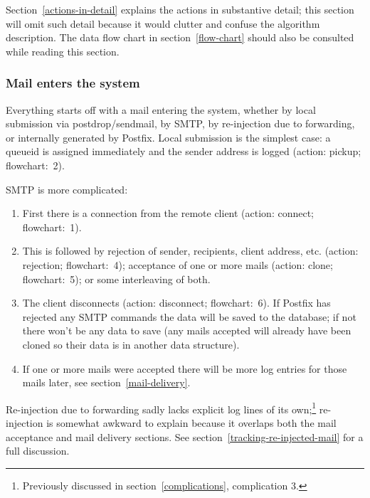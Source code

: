 \documentclass[a4paper,12pt,draft]{article}
\begin{document}
Section~\ref{actions-in-detail} explains the actions in substantive detail;
this section will omit such detail because it would clutter and confuse the
algorithm description.  The data flow chart in section~\ref{flow-chart}
should also be consulted while reading this section.

\subsubsection{Mail enters the system}

\label{mail-enters-the-system}

Everything starts off with a mail entering the system, whether by local
submission via postdrop/sendmail, by SMTP, by re-injection due to
forwarding, or internally generated by Postfix.  Local submission is the
simplest case: a queueid is assigned immediately and the sender address is
logged (action: pickup; flowchart:~2).

SMTP is more complicated: 

\begin{enumerate}
        
    \item First there is a connection from the remote client
        (action: connect; flowchart:~1).

    \item This is followed by rejection of sender, recipients, client
        address, etc. (action: rejection; flowchart:~4); acceptance of one
        or more mails (action: clone; flowchart:~5); or some interleaving
        of both.
        
    \item The client disconnects (action: disconnect; flowchart:~6).  If
        Postfix has rejected any SMTP commands the data will be saved to
        the database; if not there won't be any data to save (any mails
        accepted will already have been cloned so their data is in another
        data structure).

    \item If one or more mails were accepted there will be more log entries
        for those mails later, see section~\ref{mail-delivery}.

\end{enumerate}

Re-injection due to forwarding sadly lacks explicit log lines of its
own;\footnote{Previously discussed in section~\ref{complications},
complication 3.} re-injection is somewhat awkward to explain because it
overlaps both the mail acceptance and mail delivery sections.  See
section~\ref{tracking-re-injected-mail} for a full discussion.
\end{document}
